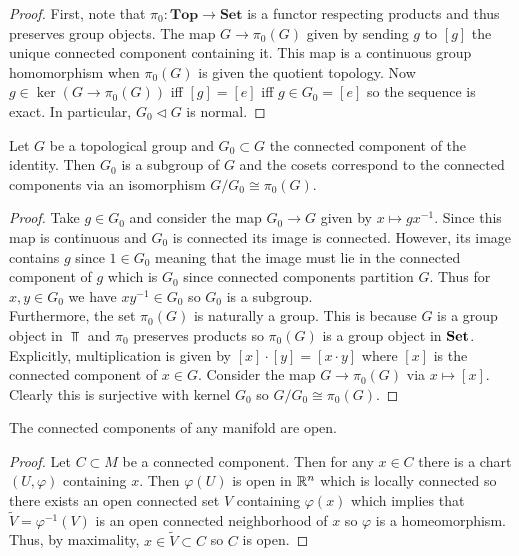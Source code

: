 \documentclass[12pt]{extarticle}
\begin{document}
\begin{proof}
First, note that $\pi_0 : \mathbf{Top} \to \mathbf{Set}$ is a functor respecting products and thus preserves group objects. The map $G \to \pi_0(G)$ given by sending $g$ to $[g]$ the unique connected component containing it. This map is a continuous group homomorphism when $\pi_0(G)$ is given the quotient topology. 
Now $g \in \ker{(G \to \pi_0(G))}$ iff $[g] = [e]$ iff $g \in G_0 = [e]$ so the sequence is exact. In particular, $G_0 \triangleleft G$ is normal.
\end{proof}

\begin{proposition}
Let $G$ be a topological group and $G_0 \subset G$ the connected component of the identity. Then $G_0$ is a subgroup of $G$ and the cosets correspond to the connected components via an isomorphism $G / G_0 \cong \pi_0(G)$.
\end{proposition}

\begin{proof}
Take $g \in G_0$ and consider the map $G_0 \to G$ given by $x \mapsto gx^{-1}$. Since this map is continuous and $G_0$ is connected its image is connected. However, its image contains $g$ since $1 \in G_0$ meaning that the image must lie in the connected component of $g$ which is $G_0$ since connected components partition $G$. Thus for $x,y \in G_0$ we have $xy^{-1} \in G_0$ so $G_0$ is a subgroup. 
\bigskip\\
Furthermore, the set $\pi_0(G)$ is naturally a group. This is because $G$ is a group object in $\Top$ and $\pi_0$ preserves products so $\pi_0(G)$ is a group object in $\mathbf{Set}$. Explicitly, multiplication is given by $[x] \cdot [y] = [x \cdot y]$ where $[x]$ is the connected component of $x \in G$. Consider the map $G \to \pi_0(G)$ via $x \mapsto [x]$. Clearly this is surjective with kernel $G_0$ so $G / G_0 \cong \pi_0(G)$.
\end{proof}

\begin{lemma}
The connected components of any manifold are open. 
\end{lemma}

\begin{proof}
Let $C \subset M$ be a connected component. Then for any $x \in C$ there is a chart $(U, \varphi)$ containing $x$. Then $\varphi(U)$ is open in $\mathbb{R}^n$ which is locally connected so there exists an open connected set $V$ containing $\varphi(x)$ which implies that $\tilde{V} = \varphi^{-1}(V)$ is an open connected neighborhood of $x$ so $\varphi$ is a homeomorphism. Thus, by maximality, $x\in \tilde{V} \subset C$ so $C$ is open.
\end{proof}
\end{document}
